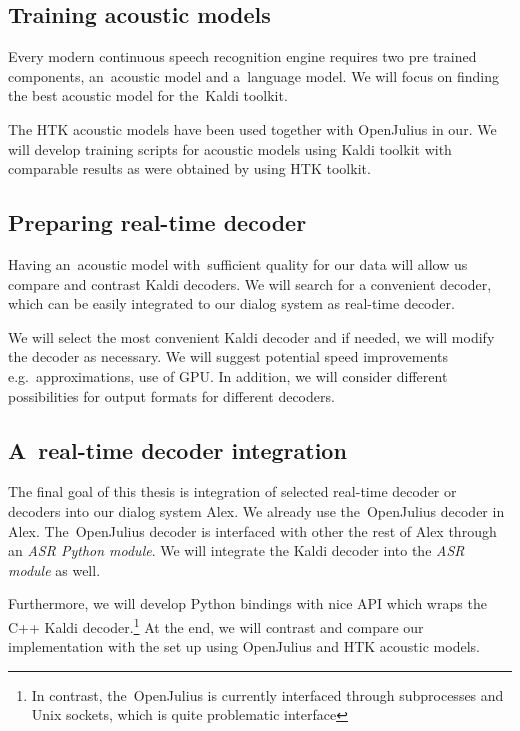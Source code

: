 \subsection{Training acoustic models} 
\label{sub:training_kaldi_acoustic_models}
Every modern continuous speech recognition engine requires two pre trained components, an~acoustic model and 
a~language model. We will focus on finding the best acoustic model for the~Kaldi toolkit. 

The \ac{HTK} acoustic models have been used together with OpenJulius in our. 
We will develop training scripts for acoustic models using Kaldi toolkit with comparable results as
were obtained by using \ac{HTK} toolkit. 

 

\subsection{Preparing real-time decoder} 
\label{sub:compare_rt}
Having an~acoustic model with~sufficient quality for our data will allow us
compare and contrast Kaldi decoders. We will search for a convenient decoder,
which can be easily integrated to our dialog system as real-time decoder.

We will select the most convenient Kaldi decoder and if needed, we will modify the decoder as necessary. 
We will suggest potential speed improvements e.g.\ approximations, use of \ac{GPU}.
In addition, we will consider different possibilities for output formats for different decoders.

\subsection{A~real-time decoder integration} 
\label{sub:integration}
The final goal of this thesis is integration of selected real-time decoder or decoders into our dialog system Alex.
We already use the~OpenJulius decoder in Alex. The~OpenJulius decoder is interfaced with other the rest of Alex
through an {\it ASR Python module}. We will integrate the Kaldi decoder into the {\it ASR module}\/ as well.

Furthermore, we will develop Python bindings with nice \ac{API} which wraps the C++ Kaldi decoder.\footnote{In contrast, 
the~OpenJulius is currently interfaced through subprocesses and Unix sockets, which is quite problematic interface} 
At the end, we will contrast and compare our implementation with the set up using OpenJulius and \ac{HTK} 
acoustic models.

